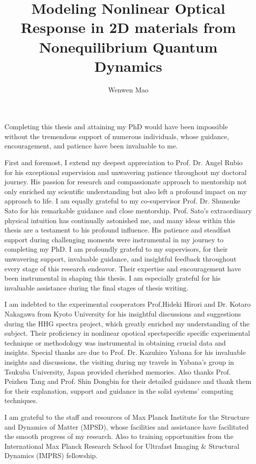 \documentclass[a4paper, twoside]{NUSThesis}
\title{Modeling Nonlinear Optical Response in 2D materials from Nonequilibrium Quantum Dynamics}
\author{Wenwen Mao}
\begin{document}
\maketitle
\makedeclaration
\frontmatter

\begin{acknowledgments}

	Completing this thesis and attaining my PhD would have been impossible without the tremendous support of numerous individuals, whose guidance, encouragement, and patience have been invaluable to me.

	First and foremost, I extend my deepest appreciation to Prof. Dr. Angel Rubio for his exceptional supervision and unwavering patience throughout my doctoral journey. His passion for research and compassionate approach to mentorship not only enriched my scientific understanding but also left a profound impact on my approach to life.
	I am equally grateful to my co-supervisor Prof. Dr. Shunsuke Sato for his remarkable guidance and close mentorship. Prof. Sato's extraordinary physical intuition has continually astonished me, and many ideas within this thesis are a testament to his profound influence. His patience and steadfast support during challenging moments were instrumental in my journey to completing my PhD. I am profoundly grateful to my supervisors, for their unwavering support, invaluable guidance, and insightful feedback throughout every stage of this research endeavor. Their expertise and encouragement have been instrumental in shaping this thesis. I am especially grateful for his invaluable assistance during the final stages of thesis writing.

	I am indebted to the experimental cooperators Prof.Hideki Hirori and Dr. Kotaro Nakagawa from Kyoto University for his insightful discussions and suggestions during the HHG spectra project, which greatly enriched my understanding of the subject. Their proficiency in nonlinear opotical spectspecific specific experimental technique or methodology was instrumental in obtaining crucial data and insights. Special thanks are due to Prof. Dr. Kazuhiro Yabana for his invaluable insights and discussions, the visiting during my travels in Yabana's group in Tsukuba University, Japan provided cherished memories. Also thanks Prof. Peizhen Tang and Prof. Shin Dongbin for their detailed guidance and thank them for their explanation, support and guidance in the solid systems' computing techniques.

	I am grateful to the staff and resources of Max Planck Institute for the Structure and Dynamics of Matter (MPSD), whose facilities and assistance have facilitated the smooth progress of my research. Also to training opportunities from the International Max Planck Research School for Ultrafast Imaging \& Structural Dynamics (IMPRS) fellowship.


\end{acknowledgments}
\end{document}
